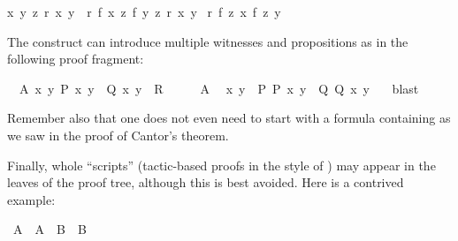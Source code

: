 \begin{isabellebody}
\begin{isamarkuptext}
\begin{isabelle}
\isaindent{\ }{\isasymAnd}x\ y\ z{\isachardot}\ {\isacharquery}r\ x\ y\ {\isasymLongrightarrow}\ {\isacharquery}r\ {\isacharparenleft}{\isacharquery}f\ x\ z{\isacharparenright}\ {\isacharparenleft}{\isacharquery}f\ y\ z{\isacharparenright}{\isacharsemicolon}\ {\isacharquery}r\ {\isacharquery}x\ {\isacharquery}y{\isasymrbrakk}\isanewline
{\isasymLongrightarrow}\ {\isacharquery}r\ {\isacharparenleft}{\isacharquery}f\ {\isacharquery}z\ {\isacharquery}x{\isacharparenright}\ {\isacharparenleft}{\isacharquery}f\ {\isacharquery}z\ {\isacharquery}y{\isacharparenright}%
\end{isabelle}
\tweakskip%
\end{isamarkuptext}%
\isamarkuptrue%
%
\isamarkuptrue%
%
\begin{isamarkuptext}%
The  construct can introduce multiple
witnesses and propositions as in the following proof fragment:%
\end{isamarkuptext}%
\isamarkuptrue%
\ \ A{\isacharcolon}\ {\isachardoublequote}{\isasymexists}x\ y{\isachardot}\ P\ x\ y\ {\isasymand}\ Q\ x\ y{\isachardoublequote}\ \ {\isachardoublequote}R{\isachardoublequote}\isanewline
\isamarkupfalse%
\ {\isacharminus}\isanewline
\ \ \isamarkupfalse%
\ A\ \isamarkupfalse%
\ x\ y\ \ P{\isacharcolon}\ {\isachardoublequote}P\ x\ y{\isachardoublequote}\ \ Q{\isacharcolon}\ {\isachardoublequote}Q\ x\ y{\isachardoublequote}\ \ \isamarkupfalse%
\ blast\isamarkupfalse%
\isamarkupfalse%
%
\begin{isamarkuptext}%
Remember also that one does not even need to start with a formula
containing \isa{{\isasymexists}} as we saw in the proof of Cantor's theorem.%
\end{isamarkuptext}%
\isamarkuptrue%
%
\isamarkuptrue%
%
\begin{isamarkuptext}%
Finally, whole ``scripts'' (tactic-based proofs in the style of
\cite{LNCS2283}) may appear in the leaves of the proof tree, although this is
best avoided.  Here is a contrived example:%
\end{isamarkuptext}%
\isamarkuptrue%
\ {\isachardoublequote}A\ {\isasymlongrightarrow}\ {\isacharparenleft}A\ {\isasymlongrightarrow}\ B{\isacharparenright}\ {\isasymlongrightarrow}\ B{\isachardoublequote}\isanewline
\isamarkupfalse%
\isanewline

\end{isabellebody}

